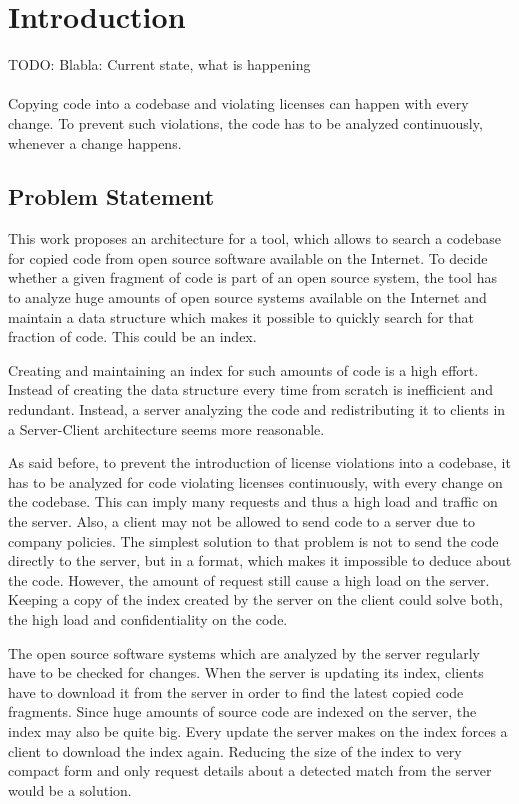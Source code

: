 
\chapter{Introduction}\label{chapter:introduction}
TODO: Blabla: Current state, what is happening
\\ \\
Copying code into a codebase and violating licenses can happen with every change.
To prevent such violations, the code has to be analyzed continuously, whenever a change happens.

\section{Problem Statement}\label{section:introduction/problem}
This work proposes an architecture for a tool, which allows to search a codebase for copied code from open source software available on the Internet.
To decide whether a given fragment of code is part of an open source system, the tool has to analyze huge amounts of open source systems available on the Internet and maintain a data structure which makes it possible to quickly search for that fraction of code.
This could be an index.

Creating and maintaining an index for such amounts of code is a high effort.
Instead of creating the data structure every time from scratch is inefficient and redundant.
Instead, a server analyzing the code and redistributing it to clients in a Server-Client architecture seems more reasonable.

As said before, to prevent the introduction of license violations into a codebase, it has to be analyzed for code violating licenses continuously, with every change on the codebase.
This can imply many requests and thus a high load and traffic on the server.
Also, a client may not be allowed to send code to a server due to company policies.
The simplest solution to that problem is not to send the code directly to the server, but in a format, which makes it impossible to deduce about the code.
However, the amount of request still cause a high load on the server.
Keeping a copy of the index created by the server on the client could solve both, the high load and confidentiality on the code.

The open source software systems which are analyzed by the server regularly have to be checked for changes.
When the server is updating its index, clients have to download it from the server in order to find the latest copied code fragments.
Since huge amounts of source code are indexed on the server, the index may also be quite big.
Every update the server makes on the index forces a client to download the index again.
Reducing the size of the index to very compact form and only request details about a detected match from the server would be a solution.


